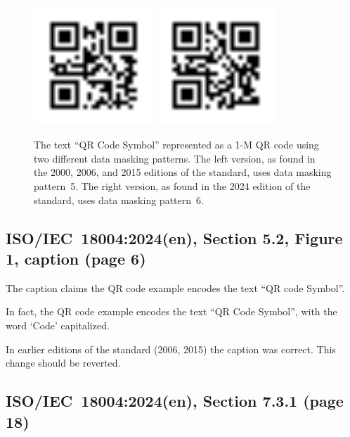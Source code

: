 \documentclass[a4paper,twoside]{article}
\newcommand{\shortstandard}{ISO/IEC~18004}
\newcommand{\standard}{\shortstandard:2024(en)}
\begin{document}
\begin{figure}[h!]
\centering
\includegraphics[width=0.4\textwidth]{images/qrcode_iso18004_2000_2006_2015_QRCodeSymbol_1Mp5.png}
\includegraphics[width=0.4\textwidth]{images/qrcode_iso18004_2024_QRCodeSymbol_1Mp6.png}
\caption{The text ``QR Code Symbol'' represented as a 1-M QR code using two different data masking patterns.
         The left version, as found in the 2000, 2006, and 2015 editions of the standard, uses data masking pattern~5.
         The right version, as found in the 2024 edition of the standard, uses data masking pattern~6.}
\label{fig:dmp-changed-1}
\end{figure}

\subsection{\standard, Section 5.2, Figure 1, caption (page 6)}

The caption claims the QR code example encodes the text ``QR code Symbol''.

In fact, the QR code example encodes the text ``QR Code Symbol'', with the word `Code' capitalized.

In earlier editions of the standard (2006, 2015) the caption was correct. This change should be reverted.

\subsection{\standard, Section 7.3.1 (page 18)}
\end{document}
